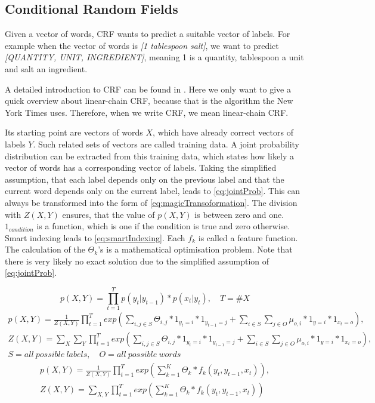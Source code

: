 \documentclass[12pt, twoside]{report}
\begin{document}
\subsection{Conditional Random Fields}
Given a vector of words, CRF wants to predict a suitable vector of labels. For example when the vector of words is \textit{[1 tablespoon salt]}, we want to predict \textit{[QUANTITY, UNIT, INGREDIENT]}, meaning 1 is a quantity, tablespoon a unit and salt an ingredient.

A detailed introduction to CRF can be found in \parencite{CRFIntroduction}. Here we only want to give a quick overview about linear-chain CRF, because that is the algorithm the New York Times uses. Therefore, when we write CRF, we mean linear-chain CRF.

Its starting point are vectors of words $X$, which have already correct vectors of labels $Y$. Such related sets of vectors are called training data. A joint probability distribution can be extracted from this training data, which states how likely a vector of words has a corresponding vector of labels. Taking the simplified assumption, that each label depends only on the previous label and that the current word depends only on the current label, leads to \cref{eq:jointProb}. This can always be transformed into the form of \cref{eq:magicTransoformation}. The division with $Z(X,Y)$ ensures, that the value of $p(X,Y)$ is between zero and one. $1_{condition}$ is a function, which is one if the condition is true and zero otherwise. Smart indexing leads to \cref{eq:smartIndexing}. Each $f_k$ is called a feature function. The calculation of the $\Theta_k$'s is a mathematical optimisation problem. Note that there is very likely no exact solution due to the simplified assumption of \cref{eq:jointProb}.

\begin{equation} \label{eq:jointProb}
p(X,Y) = \prod_{t=1}^T p(y_t|y_{t-1}) * p(x_t|y_t), \quad T = \#X
\end{equation}
\begin{align}\label{eq:magicTransoformation}
p(X,Y) = \frac{1}{Z(X,Y)}\prod_{t=1}^T exp(\sum_{i,j\in S}^{} \Theta_{i,j} * 1_{y_t=i} * 1_{y_{t-1}=j} + \sum_{i \in S}^{} \sum_{j \in O}^{} \mu_{o,i} * 1_{y=i} * 1_{x_t=o}), \nonumber
\\
Z(X,Y) = \sum_{X}^{}\sum_{Y}^{}\prod_{t=1}^T exp(\sum_{i,j\in S}^{} \Theta_{i,j} * 1_{y_t=i} * 1_{y_{t-1}=j} + \sum_{i \in S}^{} \sum_{j \in O}^{} \mu_{o,i} * 1_{y=i} * 1_{x_t=o}), \nonumber
\\
S = all\ possible\ labels, \quad O = all\ possible\ words
\end{align}
\begin{align} \label{eq:smartIndexing}
p(X,Y) = \frac{1}{Z(X,Y)}\prod_{t=1}^T exp(\sum_{k=1}^{K} \Theta_{k} * f_k(y_t, y_{t-1}, x_t)), \nonumber
\\
Z(X,Y) = \sum_{X,Y}^{}\prod_{t=1}^T exp(\sum_{k=1}^{K} \Theta_{k} * f_k(y_t, y_{t-1}, x_t))
\end{align}
\end{document}
